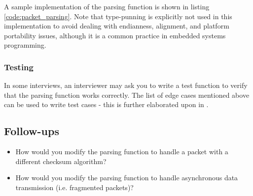 \documentclass[main.tex]{subfiles}
\begin{document}
\noindent A sample implementation of the parsing function is shown in listing \ref{code:packet_parsing}. Note that type-punning is explicitly not used in this implementation to avoid dealing with endianness, alignment, and platform portability issues, although it is a common practice in embedded systems programming.



\subsubsection{Testing}
In some interviews, an interviewer may ask you to write a test function to verify that the parsing function works correctly. The list of edge cases mentioned above can be used to write test cases - this is further elaborated upon in .

\subsection{Follow-ups}
\begin{itemize}
    \item How would you modify the parsing function to handle a packet with a different checksum algorithm?
    \item How would you modify the parsing function to handle asynchronous data transmission (i.e. fragmented packets)?
\end{itemize}
\end{document}
